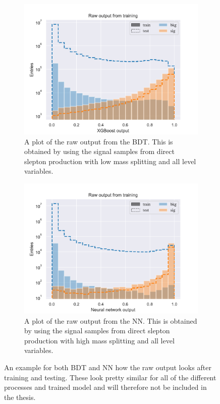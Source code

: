 \begin{figure}[H]
    \centering
    \begin{subfigure}[t!]{0.49\textwidth}
        \includegraphics[width = \textwidth]{Figures/SlepSlep/ML/BDT/All_level/Low/rawPlot.pdf}
        \caption{A plot of the raw output from the BDT. This is obtained by using the signal samples from direct slepton production with low mass splitting and all level variables.}
        \label{fig:SlepSlepBDTLowLevelLowRaw}
    \end{subfigure}
    \begin{subfigure}[t!]{0.49\textwidth}
        \includegraphics[width = \textwidth]{Figures/SlepSlep/ML/NN/All_level/High/rawPlot.pdf}
        \caption{A plot of the raw output from the NN. This is obtained by using the signal samples from direct slepton production with high mass splitting and all level variables.}
        \label{fig:SlepSlepNNLowLevelHighRaw}
    \end{subfigure}
    \caption{An example for both BDT and NN how the raw output looks after training and testing. These look pretty similar for all of the different processes and trained model and will therefore not be included in the thesis.}
    \label{fig:rawOutput}
\end{figure}



